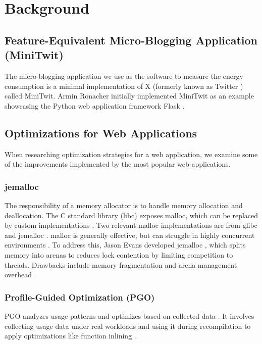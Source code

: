 \documentclass[main.tex]{subfiles}
\begin{document}
\section{Background}
\label{section:background}

\subsection{Feature-Equivalent Micro-Blogging Application (MiniTwit)}

The micro-blogging application we use as the software to measure the energy consumption is a minimal implementation of X (formerly known as Twitter \cite{verge-twitter-rebrand-x}) called MiniTwit. Armin Ronacher initially implemented MiniTwit as an example showcasing the Python web application framework Flask \cite{ronacher-minitwit-commit}. 

\subsection{Optimizations for Web Applications}

When researching optimization strategies for a web application, we examine some of the improvements implemented by the most popular web applications.

\subsubsection{jemalloc}

The responsibility of a memory allocator is to handle memory allocation and deallocation. The C standard library (libc) \cite{c-language-iso9899-2024} exposes malloc, which can be replaced by custom implementations \cite{Berger_Zorn_McKinley}. Two relevant malloc implementations are from glibc \cite{glibc} and jemalloc \cite{evans2006scalable}. malloc is generally effective, but can struggle in highly concurrent environments \cite{evans2006scalable}. To address this, Jason Evans developed jemalloc \cite{evans2006scalable}, which splits memory into arenas to reduces lock contention by limiting competition to threads. Drawbacks include memory fragmentation and arena management overhead \cite{evans2006scalable}.

\subsubsection{Profile-Guided Optimization (PGO)}

PGO analyzes usage patterns and optimizes based on collected data \cite{Wicht_Vitillo_Chen_Levinthal_2014}. It involves collecting usage data under real workloads and using it during recompilation to apply optimizations like function inlining \cite{Wade_Kulkarni_Jantz_2017}. 
\end{document}
